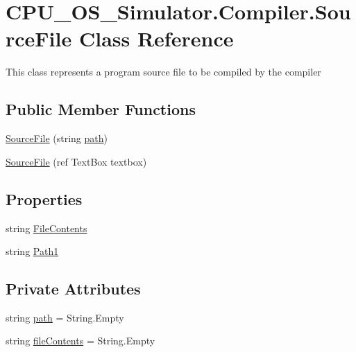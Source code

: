 \hypertarget{class_c_p_u___o_s___simulator_1_1_compiler_1_1_source_file}{}\section{C\+P\+U\+\_\+\+O\+S\+\_\+\+Simulator.\+Compiler.\+Source\+File Class Reference}
\label{class_c_p_u___o_s___simulator_1_1_compiler_1_1_source_file}


This class represents a program source file to be compiled by the compiler  


\subsection*{Public Member Functions}
\begin{DoxyCompactItemize}
\item 
\hyperlink{class_c_p_u___o_s___simulator_1_1_compiler_1_1_source_file_a6362ac3247923275ce61f3064269c23e}{Source\+File} (string \hyperlink{class_c_p_u___o_s___simulator_1_1_compiler_1_1_source_file_a98f1ce0eeb141f1c1e4643d65eb9b87e}{path})
\item 
\hyperlink{class_c_p_u___o_s___simulator_1_1_compiler_1_1_source_file_a1e0286e0d8022b68a9265cecc3a475ec}{Source\+File} (ref Text\+Box textbox)
\end{DoxyCompactItemize}
\subsection*{Properties}
\begin{DoxyCompactItemize}
\item 
string \hyperlink{class_c_p_u___o_s___simulator_1_1_compiler_1_1_source_file_a6b5d8d9ced4b711efe1a314bc4c1befd}{File\+Contents}
\item 
string \hyperlink{class_c_p_u___o_s___simulator_1_1_compiler_1_1_source_file_a4818dd5ba0ad586dee734231f1c2ebb2}{Path1}
\end{DoxyCompactItemize}
\subsection*{Private Attributes}
\begin{DoxyCompactItemize}
\item 
string \hyperlink{class_c_p_u___o_s___simulator_1_1_compiler_1_1_source_file_a98f1ce0eeb141f1c1e4643d65eb9b87e}{path} = String.\+Empty
\item 
string \hyperlink{class_c_p_u___o_s___simulator_1_1_compiler_1_1_source_file_a049f7ad487a1b707fe3b89e33de168fa}{file\+Contents} = String.\+Empty
\end{DoxyCompactItemize}


